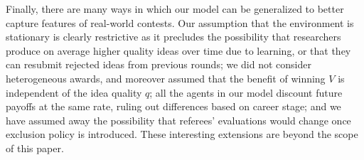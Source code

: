 \documentclass[12pt]{article}
\theoremstyle{plain}
\theoremstyle{definition}
\theoremstyle{remark}
\begin{document}
Finally, there are many ways in which our model can be generalized to better capture features of real-world contests. Our assumption that the environment is stationary is clearly restrictive as it precludes the possibility that researchers produce on average higher quality ideas over time due to learning, or that they can resubmit rejected ideas from previous rounds; we did not consider heterogeneous awards, and moreover assumed that the benefit of winning $V$ is independent of the idea quality $q$; all the agents in our model discount future payoffs at the same rate, ruling out differences based on career stage; and we have assumed away the possibility that referees' evaluations would change once exclusion policy is introduced. These interesting extensions are beyond the scope of this paper.  

 








    

\end{document}
